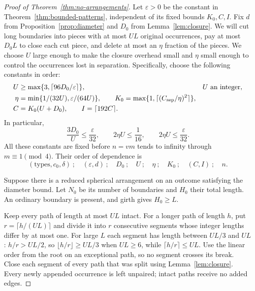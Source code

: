 \begin{proof}[Proof of Theorem~\ref{thm:no-arrangements}]
Let $\varepsilon>0$ be the constant in
Theorem~\ref{thm:bounded-patterns}, independent of its fixed bounds
$K_0,C,I$.  Fix $d$ from Proposition~\ref{prop:diameter} and $D_0$ from
Lemma~\ref{lem:closure}. We will cut long boundaries into pieces with
at most $UL$ original occurrences, pay at most $D_0L$ to close each
cut piece, and delete at most an $\eta$ fraction of the pieces.
We choose $U$ large enough to make the closure overhead small and
$\eta$ small enough to control the occurrences lost in separation.
Specifically, choose the following constants in order:
\begin{align}
 U&\ge\max\{3,\lceil96D_0/\varepsilon\rceil\},
       &&\text{$U$ an integer},\notag\\
 \eta&=\min\{1/(32U),\varepsilon/(64U)\},\qquad
 K_0=\max\{1,\lceil(C_{\mathrm{sep}}/\eta)^2\rceil\},
 \label{eq:extraction-constants}\\
 C&=K_0(U+D_0),\qquad I=\lceil192C\rceil.\notag
\end{align}
In particular,
\begin{equation}
 \frac{3D_0}{U}\le\frac{\varepsilon}{32},\qquad
 2\eta U\le\frac1{16},\qquad
 2\eta U\le\frac{\varepsilon}{32}.
 \label{eq:extraction-losses}
\end{equation}
All these constants are fixed before $n=vm$ tends to infinity through
$m\equiv1\pmod4$.  Their order of dependence is
\[
 (\text{types},c_0,\delta)\ ;\quad
 (\varepsilon,d)\ ;\quad D_0\ ;\quad U\ ;\quad\eta\ ;\quad
 K_0\ ;\quad (C,I)\ ;\quad n.
\]

Suppose there is a reduced spherical arrangement on an outcome
satisfying the diameter bound.  Let $N_0$ be its number of boundaries
and $H_0$ their total length.  An ordinary boundary is present, and
girth gives $H_0\ge L$.

Keep every path of length at most $UL$ intact.  For a longer path of
length $h$, put $r=\lceil h/(UL)\rceil$ and divide it into $r$
consecutive segments whose integer lengths differ by at most one.
For large $L$ each segment has length between $UL/3$ and $UL$:
$h/r>UL/2$, so $\lfloor h/r\rfloor\ge UL/3$ when $UL\ge6$, while
$\lceil h/r\rceil\le UL$.  Use the linear order from the root on an
exceptional path, so no segment crosses its break.  Close each segment
of every path that was split using Lemma~\ref{lem:closure}.  Every
newly appended occurrence is left unpaired; intact paths receive no
added edges.


\end{proof}
